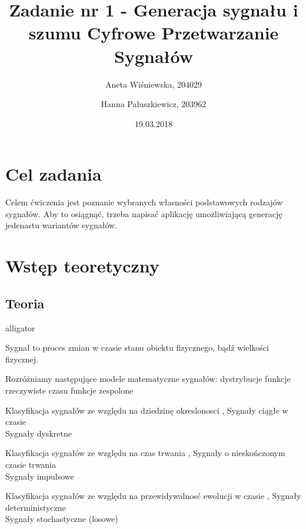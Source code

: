 \documentclass[12pt]{article}
\title{{\bf Zadanie nr 1 - Generacja sygnału i szumu}\linebreak
Cyfrowe Przetwarzanie Sygnałów}
\author{Aneta Wiśniewska, 204029 \and Hanna Paluszkiewicz, 203962}
\date{19.03.2018}
\begin{document}
\clearpage\maketitle
\thispagestyle{empty}
\newpage
\setcounter{page}{1}
\section{Cel zadania}

Celem ćwiczenia jest poznanie wybranych własności podstawowych rodzajów sygnałów. Aby to osiągnąć, trzeba napisać aplikację umożliwiającą generację jedenastu wariantów sygnałów.

\section{Wstęp teoretyczny}

\subsection{Teoria}



\begin{labeling}{alligator}
\item [Sygnał] to proces zmian w czasie stanu obiektu fizycznego, bądź wielkości fizycznej.

\subitem  Rozróżniamy następujące modele matematyczne sygnałów:
\subsubitem dystrybucje
\subsubitem funkcje rzeczywiste czasu
\subsubitem funkcje zespolone

\item [Klasyfikacja sygnałów ze względu na dziedzinę okreslonosci ] ,
\subitem  Sygnały ciągłe w czasie \\
\subitem Sygnały dyskretne

\item [Klasyfikacja sygnałów ze względu na czas trwania ] ,
\subitem  Sygnały o nieskończonym czasie trwania \\
\subitem Sygnały impulsowe

\item [Klasyfikacja sygnałów ze względu na przewidywalnosć ewolucji w czasie ] ,
\subitem  Sygnały deterministyczne \\
\subitem Sygnały stochastyczne (losowe)
\end{labeling}
\end{document}
